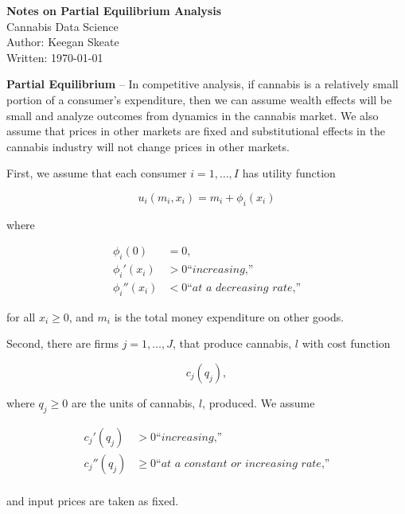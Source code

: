\documentclass[11pt]{article}
\begin{document}
\noindent\Large {\bfseries\LARGE Notes on Partial Equilibrium Analysis}\\Cannabis Data Science\\ Author: Keegan Skeate\\Written: \medskip\today


\vspace{\baselineskip}

{\bfseries Partial Equilibrium} -- In competitive analysis, if cannabis is a relatively small portion of a consumer's expenditure, then we can assume wealth effects will be small and analyze outcomes from dynamics in the cannabis market. We also assume that prices in other markets are fixed and substitutional effects in the cannabis industry will not change prices in other markets.

\vspace{\baselineskip}
First, we assume that each consumer $i=1,\dots,I$ has utility function

$$
u_i(m_i, x_i) = m_i + \phi_i(x_i)
$$

where

\begin{align*}
\phi_i(0) &= 0, \\
\phi_i'(x_i) & > 0  \textit{``increasing,''} \\
\phi_i''(x_i) & < 0 \textit{``at a decreasing rate,''}
\end{align*}

\vspace{\baselineskip}
for all $ x_i \geq 0$, and $m_i$ is the total money expenditure on other goods. 

\vspace{\baselineskip}
Second, there are firms $j=1,\dots,J$, that produce cannabis, $l$ with cost function

$$
c_j(q_j),
$$

\vspace{\baselineskip}
where $q_j \geq 0 $ are the units of cannabis, $l$, produced. We assume

\begin{align*}
c_j'(q_j) &> 0  \textit{``increasing,''} \\
c_j''(q_j) &\geq 0  \textit{``at a constant or increasing rate,''} \\
\end{align*}

and input prices are taken as fixed.
\end{document}
